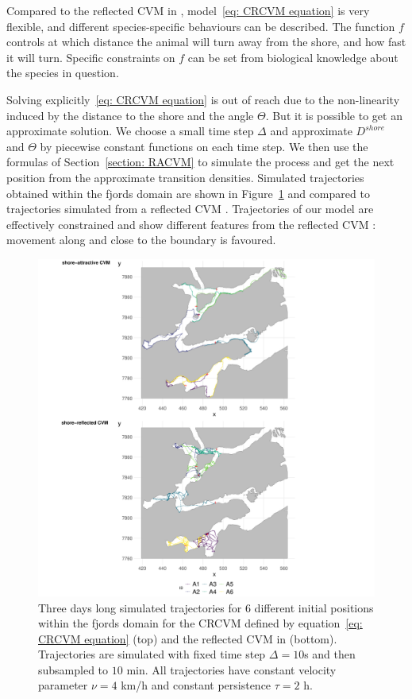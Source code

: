 \documentclass[aoas]{imsart}
\theoremstyle{definition}
\theoremstyle{remark}
\theoremstyle{remark}
\newcommand {\1}{\mathbb{1}}
\begin{document}
Compared to the reflected CVM in \cite{hanks_reflected_2017}, model~\eqref{eq: CRCVM equation} is very flexible, and different species-specific behaviours can be described. The function $f$ controls at which distance the animal will turn away from the shore, and how fast it will turn.  Specific constraints on $f$ can be set from biological knowledge about the species in question. 

Solving explicitly~\eqref{eq: CRCVM equation} is out of reach due to the non-linearity induced by the distance to the shore and the angle $\Theta$. But it is possible to get an approximate solution. We choose a small time step $\Delta$ and approximate $D^{shore}$ and $\Theta$ by piecewise constant functions on each time step. We then use the formulas of Section~\ref{section: RACVM} to simulate the process and get the next position from the approximate transition densities. Simulated trajectories obtained within the fjords domain are shown in Figure~\ref{fig: crcvm examples} and compared to trajectories simulated from a reflected CVM \citep{hanks_reflected_2017}. Trajectories of our model are effectively constrained and show different features from the reflected CVM : movement along and close to the boundary is favoured.   \\

\begin{figure}[ht!]
	\includegraphics[scale=0.42]{images/crcvm/illustrative_trajectories_fjords.pdf}

	\caption{Three days long simulated trajectories for $6$ different initial positions within the fjords domain for the CRCVM defined by equation~\eqref{eq: CRCVM equation} (top) and the reflected CVM in \cite{hanks_reflected_2017} (bottom). Trajectories are simulated with fixed time step $\Delta= 10 $s and then subsampled to $10 $ min. All trajectories have constant velocity parameter $\nu=4$ km/h and constant persistence $\tau=2$ h.}
 \label{fig: crcvm examples}
\end{figure}
\end{document}
